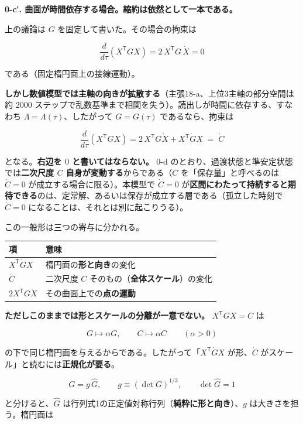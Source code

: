 \documentclass[
  10pt,
]{ltjsarticle}
\newcounter{none} %
\begin{document}
\textbf{0-c′. 曲面が時間依存する場合。縮約は依然として一本である。}

上の議論は \(G\) を固定して書いた。その場合の拘束は

\[\frac{d}{d\tau}\left(X^{\mathsf T}GX\right) = 2\,X^{\mathsf T}G\,\dot X = 0\]

である（固定楕円面上の接線運動）。

\textbf{しかし数値模型では主軸の向きが拡散する}（主張18-a、上位3主軸の部分空間は約
2000
ステップで乱数基準まで相関を失う）。読出しが時間に依存する、すなわち
\(\Lambda = \Lambda(\tau)\)、したがって \(G = G(\tau)\)
であるなら、拘束は

\[\boxed{\;\frac{d}{d\tau}\left(X^{\mathsf T}G X\right) = 2\,X^{\mathsf T}G\dot X + X^{\mathsf T}\dot G X \;=\; \dot C\;}\]

となる。\textbf{右辺を \(0\) と書いてはならない。} 0-d
のとおり、過渡状態と準安定状態では\textbf{二次尺度 \(C\)
自身が変動する}からである（\(C\) を「保存量」と呼べるのは \(\dot C = 0\)
が成立する場合に限る）。本模型で \(\dot C = 0\)
が\textbf{区間にわたって持続すると期待できる}のは、定常解、あるいは保存が成立する層である（孤立した時刻で
\(\dot C=0\) になることは、それとは別に起こりうる）。

この一般形は三つの寄与に分かれる。

{\def\LTcaptype{none} %
\begin{longtable}[]{@{}ll@{}}
\toprule\noalign{}
項 & 意味 \\
\midrule\noalign{}
\endhead
\bottomrule\noalign{}
\endlastfoot
\(X^{\mathsf T}\dot G X\) & 楕円面の\textbf{形と向き}の変化 \\
\(\dot C\) & 二次尺度 \(C\) そのもの（\textbf{全体スケール}）の変化 \\
\(2X^{\mathsf T}G\dot X\) & その曲面上での\textbf{点の運動} \\
\end{longtable}
}

\textbf{ただしこのままでは形とスケールの分離が一意でない。}
\(X^{\mathsf T}GX = C\) は

\[G \mapsto \alpha G, \qquad C \mapsto \alpha C \qquad (\alpha > 0)\]

の下で同じ楕円面を与えるからである。したがって「\(X^{\mathsf T}\dot GX\)
が形、\(\dot C\) がスケール」と読むには\textbf{正規化が要る}。

\[G = g\,\widehat{G}, \qquad g \equiv (\det G)^{1/3}, \qquad \det\widehat{G} = 1\]

と分けると、\(\widehat G\)
は行列式1の正定値対称行列（\textbf{純粋に形と向き}）、\(g\)
は大きさを担う。楕円面は
\end{document}
